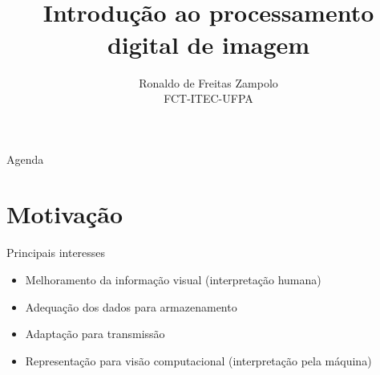 


\title{\cursogrande\\ \vspace{1cm}Introdução ao processamento digital de imagem}
\author{Ronaldo de Freitas Zampolo\\FCT-ITEC-UFPA}


   \maketitle[randomdots={false}]
   \begin{slide}{Agenda}
      \tableofcontents[content=sections]
   \end{slide}

   \section[ slide = true]{Motivação}
      \begin{slide}[toc=]{Principais interesses}
		\begin{itemize}
		      \item Melhoramento da informação visual (interpretação humana)
		      \item Adequação dos dados para armazenamento
		      \item Adaptação para transmissão
		      \item Representação para visão computacional (interpretação pela máquina)
		\end{itemize}
      \end{slide}


